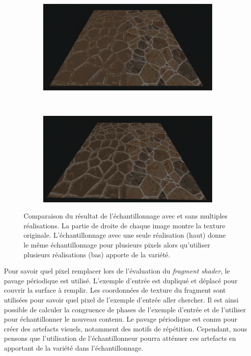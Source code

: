 \bigskip

\begin{figure}
    \centering
    \begin{subfigure}{.95\textwidth}
        \centering
        \includegraphics[width=\textwidth]{contenu/resources/images/partitioned_sampling_pc_preserving_no_shuffle}
    \end{subfigure}
    \\
    \begin{subfigure}{.95\textwidth}
        \centering
        \includegraphics[width=\textwidth]{contenu/resources/images/partitioned_sampling_pc_preserving_shuffle_uv}
    \end{subfigure}
    \caption[Échantillonnage avec et sans multiples réalisations]{Comparaison du résultat de l'échantillonnage avec et sans multiples réalisations. La partie de droite de chaque image montre la texture originale. L'échantillonnage avec une seule réalisation (haut) donne le même échantillonnage pour plusieurs pixels alors qu'utiliser plusieurs réalisations (bas) apporte de la variété.}
    \label{fig:offset-shuffle}
\end{figure}

Pour savoir quel pixel remplacer lors de l'évaluation du \textit{fragment shader}, le pavage périodique est utilisé. L'exemple d'entrée est dupliqué et déplacé pour couvrir la surface à remplir. Les coordonnées de texture du fragment sont utilisées pour savoir quel pixel de l'exemple d'entrée aller chercher. Il est ainsi possible de calculer la congruence de phases de l'exemple d'entrée et de l'utiliser pour échantillonner le nouveau contenu. Le pavage périodique est connu pour créer des artefacts visuels, notamment des motifs de répétition. Cependant, nous pensons que l'utilisation de l'échantillonneur pourra atténuer ces artefacts en apportant de la variété dans l'échantillonnage.

